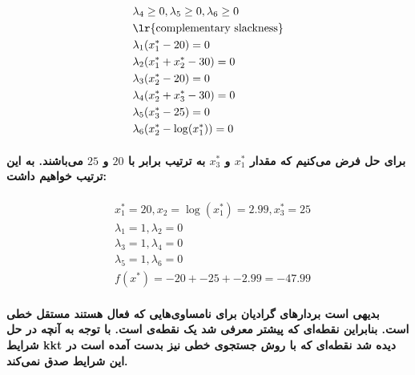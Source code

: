\documentclass[paper=a4, fontsize=11pt]{article}
\numberwithin{equation}{section} %
\numberwithin{figure}{section} %
\numberwithin{table}{section} %
\begin{document}
\begin{equation}
\begin{aligned}
		& \lambda_4 \ge 0,
		\lambda_5 \ge 0,
		\lambda_6 \ge 0 \\
		& \text{\lr{complementary slackness}} \\
		& \lambda_1(x^*_1 - 20) = 0\\
		& \lambda_2(x^*_1 + x^*_2 - 30) = 0 \\
		& \lambda_3(x^*_2 - 20) = 0 \\
		& \lambda_4(x^*_2 + x^*_3 - 30) = 0 \\
		& \lambda_5(x^*_3 - 25) = 0 \\
		& \lambda_6(x^*_2 - \log(x^*_1)) = 0 \\
	\end{aligned}					
\end{equation}

\paragraph{
	برای حل فرض می‌کنیم که مقدار $x^*_1$ و $x^*_3$ به ترتیب برابر با $20$ و $25$ می‌باشند. به این ترتیب خواهیم داشت:
}

\begin{equation}
	\begin{aligned}
		& x^*_1 = 20, x_2 = \log(x^*_1) = 2.99, x^*_3 = 25 \\
		& \lambda_1 = 1, \lambda_2 = 0 \\
		& \lambda_3 = 1, \lambda_4 = 0 \\
		& \lambda_5 = 1, \lambda_6 = 0 \\
		& f(x^*) = -20 + -25 + -2.99 = -47.99
	\end{aligned}					
\end{equation}

\paragraph{
	بدیهی است بردارهای گرادیان برای نامساوی‌هایی که فعال هستند مستقل خطی است. بنابراین نقطه‌ای که پیشتر معرفی شد یک نقطه‌ی  است.
	با توجه به آنچه در حل شرایط kkt دیده شد نقطه‌ای که با روش جستجوی خطی نیز بدست آمده است در این شرایط صدق نمی‌کند.
}
\end{document}

